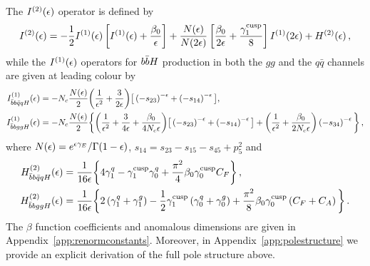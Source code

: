 \documentclass[main.tex]{subfiles}
\begin{document}
The $I^{(2)}(\epsilon)$ operator is defined by
\begin{equation}
I^{(2)}(\epsilon) =   - \frac{1}{2}I^{(1)}(\epsilon) \left[ I^{(1)}(\epsilon)
              + \frac{\beta_0}{\epsilon} \right]
              + \frac{N(\epsilon)}{N(2\epsilon)} \left[ \frac{\beta_0}{2\epsilon}
                        + \frac{\gamma_{1}^{{\mathrm{cusp}}}}{8} \right] I^{(1)}(2\epsilon)
              + H^{(2)}(\epsilon) \,,
\end{equation}
while the $I^{(1)}(\epsilon)$ operators for $b\bar{b}H$ production in both the $gg$ and the $q\bar{q}$ channels are given at leading colour by
\begin{align}
I_{\bar{b}b\bar{q}qH}^{(1)}(\epsilon) &= -N_c \frac{N(\epsilon)}{2} \bigg( \frac{1}{\epsilon^2} + \frac{3}{2\epsilon} \bigg) \big[ \left(-s_{23}\right)^{-\epsilon} + \left(-s_{14}\right)^{-\epsilon} \big], 
\label{eq:I1bbqqh}\\
I_{\bar{b}bggH}^{(1)}(\epsilon) &= -N_c \frac{N(\epsilon)}{2} \bigg\lbrace \bigg( \frac{1}{\epsilon^2} + \frac{3}{4\epsilon} + \frac{\beta_0}{4 N_c\epsilon} \bigg) \big[ \left(-s_{23}\right)^{-\epsilon} + \left(-s_{14}\right)^{-\epsilon} \big]
                 + \bigg( \frac{1}{\epsilon^2} + \frac{\beta_0}{2 N_c \epsilon} \bigg) \left(-s_{34}\right)^{-\epsilon} \bigg\rbrace \,,
\label{eq:I1bbggh}
\end{align}
where $N(\epsilon) = {e^{\epsilon \gamma_E}}/{\Gamma(1-\epsilon)}$, $s_{14} = s_{23}-s_{15}-s_{45}+p_5^2$ and
\begin{align}
H_{\bar{b}b\bar{q}qH}^{(2)}(\epsilon) &= \frac{1}{16\epsilon} \bigg\lbrace 4 \gamma_1^q - \gamma_1^{\mathrm{cusp}} \gamma_0^q + \frac{\pi^2}{4} \beta_0 \gamma_0^{\mathrm{cusp}} C_F \bigg\rbrace \,, \label{eq:H2bbqqH} \\
H_{\bar{b}bggH}^{(2)}(\epsilon) &=  \frac{1}{16\epsilon} \bigg\lbrace 2\left(\gamma_1^q+\gamma_1^g\right)
                                                - \frac{1}{2}\gamma_1^{\mathrm{cusp}} \left(\gamma_0^q+\gamma_0^g\right)
                                                + \frac{\pi^2}{8} \beta_0 \gamma_0^{\mathrm{cusp}} \left(C_F+C_A\right) \bigg\rbrace \,. \label{eq:H2bbggH}
\end{align}
The $\beta$ function coefficients and anomalous dimensions are given in Appendix~\ref{app:renormconstants}. Moreover, in Appendix~\ref{app:polestructure} we provide an explicit derivation of the full pole structure above.
\end{document}
